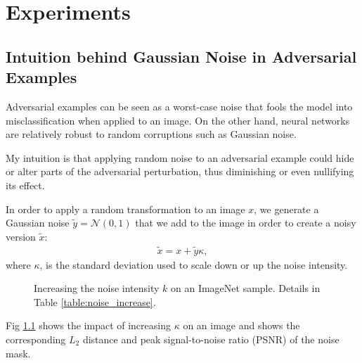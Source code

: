 \chapter{Experiments}
\label{Experiments}
\overridetextsize

\section{Intuition behind Gaussian Noise in Adversarial Examples}
\label{sec:experiments_overview}


Adversarial examples can be seen as a worst-case noise that fools the model into
misclassification when applied to an image. On the other hand, neural networks
are relatively robust to random corruptions such as Gaussian noise.

My intuition is that applying random noise to an adversarial example could hide
or alter parts of the adversarial perturbation, thus diminishing or even
nullifying its effect.

In order to apply a random transformation to an image $x$, we generate a
Gaussian noise $\tilde{y}=\mathcal{N}(0,1)$ that we add to the image in order to
create a noisy version $\tilde{x}$:
\begin{align} \label{eq:noisy_version}
    \tilde{x}=x+\tilde{y}\kappa,
\end{align}
where $\kappa$, is the standard deviation used to scale down or up the noise
intensity.

\begin{figure}
      

      

    \caption{ Increasing the noise intensity $k$ on an ImageNet sample. Details
        in Table \ref{table:noise_increase}.}
    \label{fig:noise_increase}
\end{figure}

Fig \ref{fig:noise_increase} shows the impact of increasing $\kappa$ on an image
and shows the corresponding $L_2$ distance and peak signal-to-noise ratio (PSNR)
of the noise mask.

